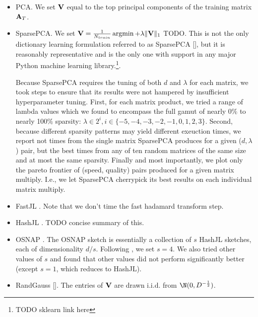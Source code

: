 \begin{itemize}\itemsep0em
    \item PCA. We set $\mathbf{V}$ equal to the top principal components of the training matrix $\mathbf{A}_T$.
    \item SparsePCA. We set $\mathbf{V} = \frac{1}{N_{train}} \operatorname*{argmin}  + \lambda \lVert\mathbf{V}\rVert_1$ TODO. This is not the only dictionary learning formulation referred to as SparsePCA [], but it is reasonably representative and is the only one with support in any major Python machine learning library.\footnote{TODO sklearn link here}.

    Because SparsePCA requires the tuning of both $d$ and $\lambda$ for each matrix, we took steps to ensure that its results were not hampered by insufficient hyperparameter tuning. First, for each matrix product, we tried a range of lambda values which we found to encompass the full gamut of nearly 0\% to nearly 100\% sparsity: $\lambda \in 2^i, i \in \{-5, -4, -3, -2, -1, 0, 1, 2, 3\}$. Second, because different sparsity patterns may yield different exeuction times, we report not times from the single matrix SparsePCA produces for a given ($d, \lambda$) pair, but the best times from any of ten random matrices of the same size and at most the same sparsity. Finally and most importantly, we plot only the pareto frontier of (speed, quality) pairs produced for a given matrix multiply. I.e., we let SparsePCA cherrypick its best results on each individual matrix multiply.
    \item FastJL \cite{fastjl}. Note that we don't time the fast hadamard transform step.
    \item HashJL \cite{hashjl}. TODO concise summary of this.
    \item OSNAP \cite{osnap}. The OSNAP sketch is essentially a collection of $s$ HashJL sketches, each of dimensionality $d / s$. Following \cite{iSVD}, we set $s = 4$. We also tried other values of $s$ and found that other values did not perform significantly better (except $s=1$, which reduces to HashJL).
    \item RandGauss []. The entries of $\mathbf{V}$ are drawn i.i.d. from $\N(0, D^{-\frac{1}{2}})$.

\end{itemize}
